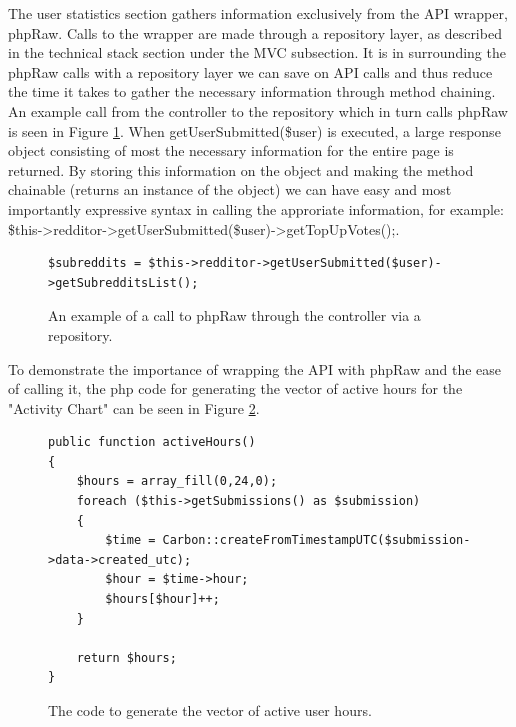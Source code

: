 \documentclass[msc,oneside]{ubcthesis}%
\begin{document}
The user statistics section gathers information exclusively from the API wrapper, phpRaw. Calls to the wrapper are made through a repository layer, as described in the technical stack section under the MVC subsection. It is in surrounding the phpRaw calls with a repository layer we can save on API calls and thus reduce the time it takes to gather the necessary information through method chaining. An example call from the controller to the repository which in turn calls phpRaw is seen in Figure \ref{fig:repotophpraw}. When getUserSubmitted(\$user) is executed, a large response object consisting of most the necessary information for the entire page is returned. By storing this information on the object and making the method chainable (returns an instance of the object) we can have easy and most importantly expressive syntax in calling the approriate information, for example: \$this->redditor->getUserSubmitted(\$user)->getTopUpVotes();.
\begin{figure}[H]
\begin{center}
\begin{lstlisting}
$subreddits = $this->redditor->getUserSubmitted($user)->getSubredditsList();
\end{lstlisting}
\end{center}
\caption[Example of call to phpRaw through controller via repository]{
An example of a call to phpRaw through the controller via a repository.}
\label{fig:repotophpraw}
\end{figure}

To demonstrate the importance of wrapping the API with phpRaw and the ease of calling it, the php code for generating the vector of active hours for the "Activity Chart" can be seen in Figure \ref{fig:activehours}.

\begin{figure}[H]
\begin{center}
\begin{lstlisting}
public function activeHours()
{
	$hours = array_fill(0,24,0);
	foreach ($this->getSubmissions() as $submission)
	{
		$time = Carbon::createFromTimestampUTC($submission->data->created_utc);
		$hour = $time->hour;
		$hours[$hour]++;
	}

	return $hours;
}
\end{lstlisting}
\end{center}
\caption[Code to generate vector of active hours]{
The code to generate the vector of active user hours.}
\label{fig:activehours}
\end{figure}
\end{document}

